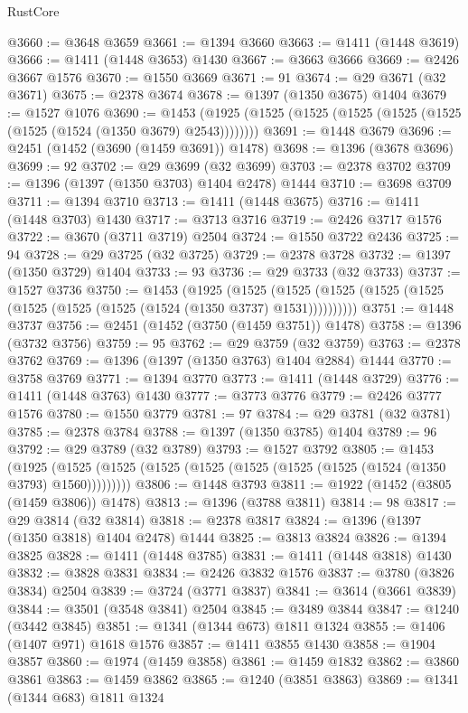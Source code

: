 \begin{lexlean}{RustCore}
\begin{coremodule}
@3660 := @3648 @3659
@3661 := @1394 @3660
@3663 := @1411 (@1448 @3619)
@3666 := @1411 (@1448 @3653) @1430
@3667 := @3663 @3666
@3669 := @2426 @3667 @1576
@3670 := @1550 @3669
@3671 := 91
@3674 := @29 @3671 (@32 @3671)
@3675 := @2378 @3674
@3678 := @1397 (@1350 @3675) @1404
@3679 := @1527 @1076
@3690 := @1453 (@1925 (@1525 (@1525 (@1525 (@1525 (@1525 (@1525 (@1524 (@1350 @3679) @2543))))))))
@3691 := @1448 @3679
@3696 := @2451 (@1452 (@3690 (@1459 @3691)) @1478)
@3698 := @1396 (@3678 @3696)
@3699 := 92
@3702 := @29 @3699 (@32 @3699)
@3703 := @2378 @3702
@3709 := @1396 (@1397 (@1350 @3703) @1404 @2478) @1444
@3710 := @3698 @3709
@3711 := @1394 @3710
@3713 := @1411 (@1448 @3675)
@3716 := @1411 (@1448 @3703) @1430
@3717 := @3713 @3716
@3719 := @2426 @3717 @1576
@3722 := @3670 (@3711 @3719) @2504
@3724 := @1550 @3722 @2436
@3725 := 94
@3728 := @29 @3725 (@32 @3725)
@3729 := @2378 @3728
@3732 := @1397 (@1350 @3729) @1404
@3733 := 93
@3736 := @29 @3733 (@32 @3733)
@3737 := @1527 @3736
@3750 := @1453
    (@1925
      (@1525 (@1525 (@1525 (@1525 (@1525 (@1525 (@1525 (@1525 (@1524 (@1350 @3737) @1531))))))))))
@3751 := @1448 @3737
@3756 := @2451 (@1452 (@3750 (@1459 @3751)) @1478)
@3758 := @1396 (@3732 @3756)
@3759 := 95
@3762 := @29 @3759 (@32 @3759)
@3763 := @2378 @3762
@3769 := @1396 (@1397 (@1350 @3763) @1404 @2884) @1444
@3770 := @3758 @3769
@3771 := @1394 @3770
@3773 := @1411 (@1448 @3729)
@3776 := @1411 (@1448 @3763) @1430
@3777 := @3773 @3776
@3779 := @2426 @3777 @1576
@3780 := @1550 @3779
@3781 := 97
@3784 := @29 @3781 (@32 @3781)
@3785 := @2378 @3784
@3788 := @1397 (@1350 @3785) @1404
@3789 := 96
@3792 := @29 @3789 (@32 @3789)
@3793 := @1527 @3792
@3805 := @1453
    (@1925 (@1525 (@1525 (@1525 (@1525 (@1525 (@1525 (@1525 (@1524 (@1350 @3793) @1560)))))))))
@3806 := @1448 @3793
@3811 := @1922 (@1452 (@3805 (@1459 @3806)) @1478)
@3813 := @1396 (@3788 @3811)
@3814 := 98
@3817 := @29 @3814 (@32 @3814)
@3818 := @2378 @3817
@3824 := @1396 (@1397 (@1350 @3818) @1404 @2478) @1444
@3825 := @3813 @3824
@3826 := @1394 @3825
@3828 := @1411 (@1448 @3785)
@3831 := @1411 (@1448 @3818) @1430
@3832 := @3828 @3831
@3834 := @2426 @3832 @1576
@3837 := @3780 (@3826 @3834) @2504
@3839 := @3724 (@3771 @3837)
@3841 := @3614 (@3661 @3839)
@3844 := @3501 (@3548 @3841) @2504
@3845 := @3489 @3844
@3847 := @1240 (@3442 @3845)
@3851 := @1341 (@1344 @673) @1811 @1324
@3855 := @1406 (@1407 @971) @1618 @1576
@3857 := @1411 @3855 @1430
@3858 := @1904 @3857
@3860 := @1974 (@1459 @3858)
@3861 := @1459 @1832
@3862 := @3860 @3861
@3863 := @1459 @3862
@3865 := @1240 (@3851 @3863)
@3869 := @1341 (@1344 @683) @1811 @1324

\end{coremodule}
\end{lexlean}
